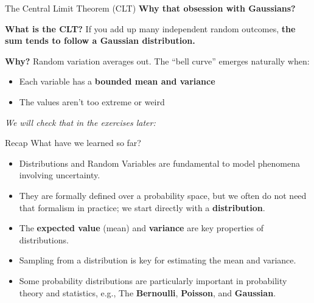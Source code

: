 \documentclass{beamer}
\begin{document}
\begin{frame}{The Central Limit Theorem (CLT)}
  \textbf{Why that obsession with Gaussians?}
  \vspace{0.5em}

\textbf{What is the CLT?}
\vspace{0.5em}
If you add up many independent random outcomes,
\textbf{the sum tends to follow a Gaussian distribution.}

\vspace{1em}
\textbf{Why?} Random variation averages out. The “bell curve” emerges naturally when:
\begin{itemize}
  \item Each variable has a \textbf{bounded mean and variance}
  \item The values aren’t too extreme or weird
\end{itemize}


\vspace{0.5em}
\textit{We will check that in the exercises later:}
\end{frame}

\begin{frame}{Recap}
  What have we learned so far?

  \begin{itemize}
  \item Distributions and Random Variables are fundamental to model phenomena involving uncertainty.
  \item They are formally defined over a probability space, but we often do not need that formalism in practice; we start directly with a \textbf{distribution}.
  \item The \textbf{expected value} (mean) and \textbf{variance} are key properties of distributions.
  \item Sampling from a distribution is key for estimating the mean and variance.
  \item Some probability distributions are particularly important in probability theory and statistics, e.g., The \textbf{Bernoulli}, \textbf{Poisson}, and \textbf{Gaussian}.
  \end{itemize}
  \vspace{0.5cm}
\end{frame}
\end{document}
